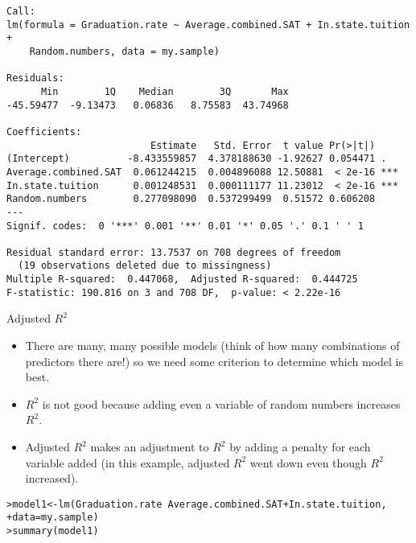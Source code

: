 \documentclass{beamer}\usepackage[]{graphicx}\usepackage[]{color}
\makeatletter
\newcommand{\hlopt}[1]{\textcolor[rgb]{1,0.894,0.769}{#1}}%
\newcommand{\hlstd}[1]{\textcolor[rgb]{1,0.894,0.769}{#1}}%
\newcommand{\hlkwb}[1]{\textcolor[rgb]{0.804,0.776,0.451}{#1}}%
\newcommand{\hlkwc}[1]{\textcolor[rgb]{0.78,0.941,0.545}{#1}}%
\newcommand{\hlkwd}[1]{\textcolor[rgb]{1,0.78,0.769}{#1}}%
\newenvironment{kframe}{%
 \def\at@end@of@kframe{}%
 \ifinner\ifhmode%
  \def\at@end@of@kframe{\end{minipage}}%
  \begin{minipage}{\columnwidth}%
 \fi\fi%
 \def\FrameCommand##1{\hskip\@totalleftmargin \hskip-\fboxsep
 \colorbox{shadecolor}{##1}\hskip-\fboxsep
     \hskip-\linewidth \hskip-\@totalleftmargin \hskip\columnwidth}%
 \MakeFramed {\advance\hsize-\width
   \@totalleftmargin\z@ \linewidth\hsize
   \@setminipage}}%
 {\par\unskip\endMakeFramed%
 \at@end@of@kframe}
\newenvironment{knitrout}{}{} %
\makeatother
\begin{document}
\begin{darkframes}
\begin{frame}[fragile]
\begin{knitrout}
\begin{kframe}
\begin{verbatim}
Call:
lm(formula = Graduation.rate ~ Average.combined.SAT + In.state.tuition + 
    Random.numbers, data = my.sample)

Residuals:
      Min        1Q    Median        3Q       Max 
-45.59477  -9.13473   0.06836   8.75583  43.74968 

Coefficients:
                         Estimate   Std. Error  t value Pr(>|t|)    
(Intercept)          -8.433559857  4.378188630 -1.92627 0.054471 .  
Average.combined.SAT  0.061244215  0.004896088 12.50881  < 2e-16 ***
In.state.tuition      0.001248531  0.000111177 11.23012  < 2e-16 ***
Random.numbers        0.277098090  0.537299499  0.51572 0.606208    
---
Signif. codes:  0 '***' 0.001 '**' 0.01 '*' 0.05 '.' 0.1 ' ' 1

Residual standard error: 13.7537 on 708 degrees of freedom
  (19 observations deleted due to missingness)
Multiple R-squared:  0.447068,	Adjusted R-squared:  0.444725 
F-statistic: 190.816 on 3 and 708 DF,  p-value: < 2.22e-16
\end{verbatim}
\end{kframe}
\end{knitrout}
    \end{frame}

    \begin{frame}{Adjusted $R^2$}
      \begin{itemize}[<+->]
        \item There are many, many possible models (think of how many combinations of predictors there are!) so we need some criterion to determine which model is best.
        \item $R^2$ is not good because adding even a variable of random numbers increases $R^2$.
        \item \alert{Adjusted $R^2$} makes an adjustment to $R^2$ by adding a penalty for each variable added (in this example, adjusted $R^2$ went down even though $R^2$ increased).
      \end{itemize}
    \end{frame}

    \begin{frame}[fragile]
      
      \fontsize{8}{8}
\begin{knitrout}
\begin{kframe}
\begin{alltt}
\hlstd{> }\hlstd{model1} \hlkwb{<-} \hlkwd{lm}\hlstd{(Graduation.rate} \hlopt{~} \hlstd{Average.combined.SAT} \hlopt{+} \hlstd{In.state.tuition,}
\hlstd{+ }             \hlkwc{data}\hlstd{=my.sample)}
\hlstd{> }\hlkwd{summary}\hlstd{(model1)}
\end{alltt}
\begin{verbatim}


\end{verbatim}
\end{kframe}
\end{knitrout}
\end{frame}
\end{darkframes}
\end{document}
